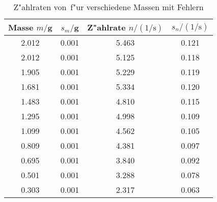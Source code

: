 \begin{table}[H]
\caption{Z"ahlraten von \kalium\,f"ur verschiedene Massen mit Fehlern}
\begin{center}
\begin{tabular}{|c|c|c|c|}
  \hline
  Masse $m /$g & $s_m /$g & Z"ahlrate $n / (1/\text{s})$ & $s_n / (1/\text{s})$ \\ \hline 
  2.012 & 0.001 & 5.463 & 0.121 \\ \hline
  2.012 & 0.001 & 5.125 & 0.118 \\ \hline
  1.905 & 0.001 & 5.229 & 0.119 \\ \hline
  1.681 & 0.001 & 5.334 & 0.120 \\ \hline
  1.483 & 0.001 & 4.810 & 0.115 \\ \hline
  1.295 & 0.001 & 4.998 & 0.109 \\ \hline
  1.099 & 0.001 & 4.562 & 0.105 \\ \hline
  0.809 & 0.001 & 4.381 & 0.097 \\ \hline
  0.695 & 0.001 & 3.840 & 0.092 \\ \hline
  0.501 & 0.001 & 3.288 & 0.078 \\ \hline
  0.303 & 0.001 & 2.317 & 0.063 \\ \hline
\end{tabular}
\end{center}
\label{tab:data:kalium}
\end{table}
